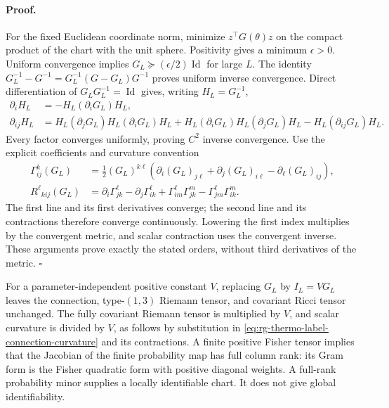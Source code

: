 \paragraph{Proof.}
For the fixed Euclidean coordinate norm, minimize
$z^\top G(\theta)z$ on the compact product of the chart with the unit
sphere. Positivity gives a minimum $\epsilon>0$. Uniform convergence
implies $G_L\succeq(\epsilon/2)\operatorname{Id}$ for large $L$.
The identity $G_L^{-1}-G^{-1}=G_L^{-1}(G-G_L)G^{-1}$ proves uniform
inverse convergence. Direct differentiation of $G_LG_L^{-1}=\operatorname{Id}$
gives, writing $H_L=G_L^{-1}$,
\begin{align}
 \partial_iH_L&=-H_L(\partial_iG_L)H_L,\\
 \partial_{ij}H_L
 &=H_L(\partial_jG_L)H_L(\partial_iG_L)H_L
  +H_L(\partial_iG_L)H_L(\partial_jG_L)H_L
  -H_L(\partial_{ij}G_L)H_L.
 \label{eq:rg-thermo-label-inverse-derivatives}
\end{align}
Every factor converges uniformly, proving $C^2$ inverse convergence.
Use the explicit coefficients and curvature convention
\begin{align}
 \Gamma^k_{ij}(G_L)
 &=\frac12(G_L)^{k\ell}
   (\partial_i(G_L)_{j\ell}+\partial_j(G_L)_{i\ell}
                                      -\partial_\ell(G_L)_{ij}),\\
 R^\ell{}_{kij}(G_L)
 &=\partial_i\Gamma^\ell_{jk}-\partial_j\Gamma^\ell_{ik}
    +\Gamma^\ell_{im}\Gamma^m_{jk}
    -\Gamma^\ell_{jm}\Gamma^m_{ik}.
 \label{eq:rg-thermo-label-connection-curvature}
\end{align}
The first line and its first derivatives converge; the second line and
its contractions therefore converge continuously. Lowering the first
index multiplies by the convergent metric, and scalar contraction uses
the convergent inverse. These arguments prove exactly the stated
orders, without third derivatives of the metric. $\square$

For a parameter-independent positive constant $V$, replacing $G_L$ by
$I_L=VG_L$ leaves the connection, type-$(1,3)$ Riemann tensor, and
covariant Ricci tensor unchanged. The fully covariant Riemann tensor
is multiplied by $V$, and scalar curvature is divided by $V$, as follows
by substitution in \cref{eq:rg-thermo-label-connection-curvature} and its
contractions. A finite positive Fisher tensor implies that the
Jacobian of the finite probability map has full column rank: its Gram
form is the Fisher quadratic form with positive diagonal weights.
A full-rank probability minor supplies a locally identifiable chart.
It does not give global identifiability.

